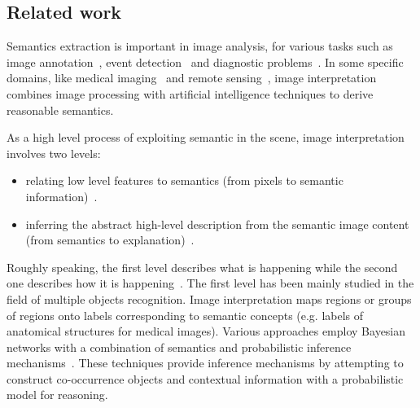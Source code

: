 \documentclass{article}
\begin{document}
 \subsection{Related work}
Semantics extraction is important in image analysis, for various tasks such as image annotation~\cite{tousch2012semantic}, event detection~\cite{lavee2009understanding} and 
diagnostic problems~\cite{atif2014explanatory,atif2007grafip}.
In some specific domains, like medical imaging~\cite{atif2014explanatory,Bloch2005fuzzy,fouquier2012sequential,nempont2013constraint} and
remote sensing~\cite{forestier2012knowledge,vanegas2013alignment}, image interpretation combines image processing with artificial intelligence techniques to derive reasonable semantics.  

As a high level process of exploiting semantic in the scene, image interpretation involves two levels:
\begin{itemize}
 \item relating low level features to semantics (from pixels to semantic information)~\cite{Bloch2005fuzzy,fouquier2012sequential,Hudelot2008fuzzy,nempont2013constraint}.
 \item inferring the abstract high-level description from the semantic image content (from semantics to explanation)~\cite{atif2014explanatory,Espinosa07multimedia}.
\end{itemize}

Roughly speaking, the first level describes what is happening while the second one describes how it is happening~\cite{tsotsos1992image}.
The first level has been mainly studied in the field of multiple objects recognition. 
Image interpretation maps regions or groups of regions onto labels corresponding to semantic concepts (e.g. labels of anatomical structures for medical images).
Various approaches employ Bayesian networks with a combination of semantics and probabilistic inference mechanisms~\cite{Luo2005Bayesian,Niko2009evidence,Singhal2003proba}.
These techniques provide inference mechanisms by attempting to construct co-occurrence objects and contextual information with a probabilistic model for reasoning.
\end{document}
